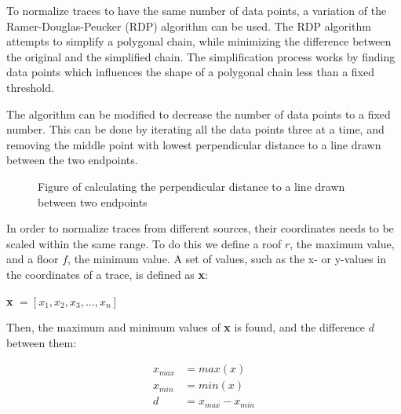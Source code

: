 To normalize traces to have the same number of data points, a variation of the Ramer-Douglas-Peucker (RDP)\cite{h_algorithms_2011} algorithm can be used. The RDP algorithm attempts to simplify a polygonal chain, while minimizing the difference between the original and the simplified chain. The simplification process works by finding data points which influences the shape of a polygonal chain less than a fixed threshold.

The algorithm can be modified to decrease the number of data points to a fixed number. This can be done by iterating all the data points three at a time, and removing the middle point with lowest perpendicular distance to a line drawn between the two endpoints.

\begin{figure}[H]
    \centering
    \caption{Figure of calculating the perpendicular distance to a line drawn between two endpoints}
    \label{fig:my_label}
\end{figure}
\label{ramer_douglas_peucker}

In order to normalize traces from different sources, their coordinates needs to be scaled within the same range. To do this we define a roof $r$, the maximum value, and a floor $f$, the minimum value. A set of values, such as the x- or y-values in the coordinates of a trace, is defined as \textbf{x}:
\begin{center}
    \textbf{x }$ = [x_1, x_2, x_3, \dots, x_n] $
\end{center}

Then, the maximum and minimum values of \textbf{x} is found, and the difference $d$ between them:
\begin{center}
\begin{align*}
    x_{max} &= max(x)\\
    x_{min} &= min(x)\\
    d &= x_{max} - x_{min} 
\end{align*}
\end{center}
    
